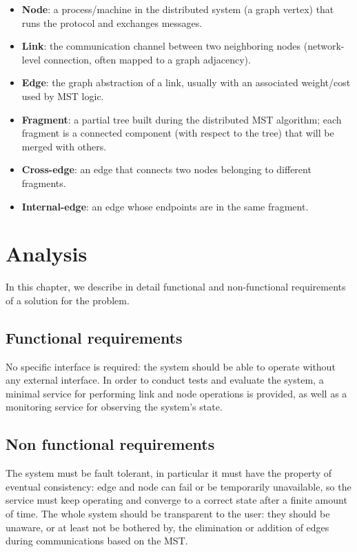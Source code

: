 \documentclass{memoir}
\begin{document}
\begin{itemize}
\item \textbf{Node}: a process/machine in the distributed system (a graph vertex) that runs the protocol and exchanges messages.
\item \textbf{Link}: the communication channel between two neighboring nodes (network-level connection, often mapped to a graph adjacency).
\item \textbf{Edge}: the graph abstraction of a link, usually with an associated weight/cost used by MST logic.
\item \textbf{Fragment}: a partial tree built during the distributed MST algorithm; each fragment is a connected component (with respect to the tree) that will be merged with others.
\item \textbf{Cross-edge}: an edge that connects two nodes belonging to different fragments.
\item \textbf{Internal-edge}: an edge whose endpoints are in the same fragment.
\end{itemize}


\chapter{Analysis}\label{ch:analysis}

In this chapter, we describe in detail functional and non-functional requirements of a solution for the problem.

\section{Functional requirements}
No specific interface is required: the system should be able to operate without any external interface. In order to conduct tests and evaluate the system, a minimal service for performing link and node operations is provided, as well as a monitoring service for observing the system's state.


\section{Non functional requirements}

The system must be fault tolerant, in particular it must have the property of eventual consistency: edge and node can fail or be temporarily unavailable, so the service must keep operating and converge to a correct state after a finite amount of time. The whole system should be transparent to the user: they should be unaware, or at least not be bothered by, the elimination or addition of edges during communications based on the MST.
\end{document}
